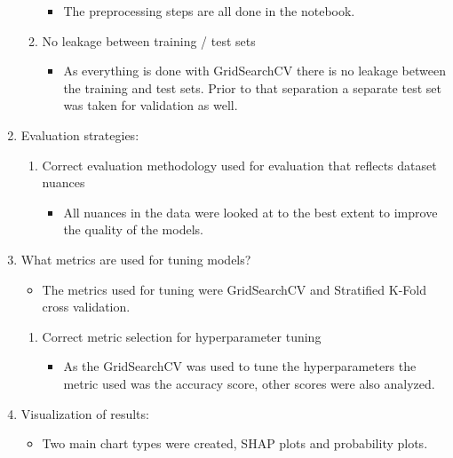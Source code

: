 \documentclass[12pt]{article}
\begin{document}
\begin{enumerate}
\begin{enumerate}
            \begin{itemize}
                \item The preprocessing steps are all done in the notebook.
            \end{itemize}
            \item No leakage between training / test sets
            \begin{itemize}
                \item As everything is done with GridSearchCV there is no leakage between the training and test sets. Prior to that separation a separate test set was taken for validation as well.
            \end{itemize}
        \end{enumerate}
        \item Evaluation strategies:
        \begin{enumerate}
            \item Correct evaluation methodology used for evaluation that reflects
            dataset nuances
            \begin{itemize}
                \item All nuances in the data were looked at to the best extent to improve the quality of the models.
            \end{itemize}
        \end{enumerate}
        \item What metrics are used for tuning models?
        \begin{itemize}
            \item The metrics used for tuning were GridSearchCV and Stratified K-Fold cross validation.
        \end{itemize}
        \begin{enumerate}
            \item Correct metric selection for hyperparameter tuning
            \begin{itemize}
                \item As the GridSearchCV was used to tune the hyperparameters the metric used was the accuracy score, other scores were also analyzed.
            \end{itemize}
        \end{enumerate}
        \item Visualization of results:
        \begin{itemize}
            \item Two main chart types were created, SHAP plots and probability plots.

\end{itemize}
\end{enumerate}
\end{document}
